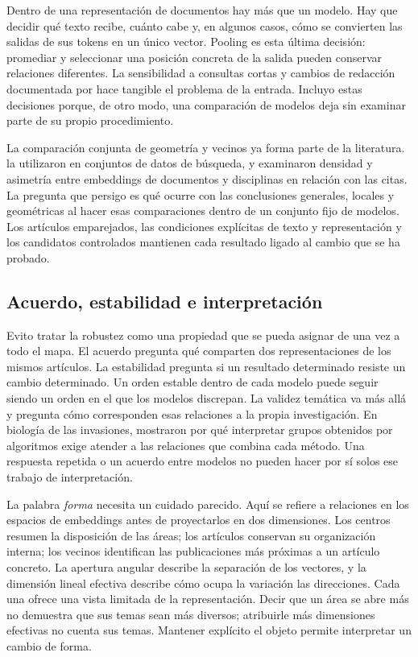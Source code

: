 \documentclass[12pt]{article}
\begin{document}
Dentro de una representación de documentos hay más que un modelo. Hay que decidir qué texto recibe, cuánto cabe y, en algunos casos, cómo se convierten las salidas de sus tokens en un único vector. Pooling es esta última decisión: promediar y seleccionar una posición concreta de la salida pueden conservar relaciones diferentes. La sensibilidad a consultas cortas y cambios de redacción documentada por \citet{singh-singh-2022-inefficiency} hace tangible el problema de la entrada. Incluyo estas decisiones porque, de otro modo, una comparación de modelos deja sin examinar parte de su propio procedimiento.

La comparación conjunta de geometría y vecinos ya forma parte de la literatura. \citet{ref4e1e0d5582} la utilizaron en conjuntos de datos de búsqueda, y \citet{ref6da178065c} examinaron densidad y asimetría entre embeddings de documentos y disciplinas en relación con las citas. La pregunta que persigo es qué ocurre con las conclusiones generales, locales y geométricas al hacer esas comparaciones dentro de un conjunto fijo de modelos. Los artículos emparejados, las condiciones explícitas de texto y representación y los candidatos controlados mantienen cada resultado ligado al cambio que se ha probado.

\subsection{Acuerdo, estabilidad e interpretación}
Evito tratar la robustez como una propiedad que se pueda asignar de una vez a todo el mapa. El acuerdo pregunta qué comparten dos representaciones de los mismos artículos. La estabilidad pregunta si un resultado determinado resiste un cambio determinado. Un orden estable dentro de cada modelo puede seguir siendo un orden en el que los modelos discrepan. La validez temática va más allá y pregunta cómo corresponden esas relaciones a la propia investigación. En biología de las invasiones, \citet{QSSreviewQ17} mostraron por qué interpretar grupos obtenidos por algoritmos exige atender a las relaciones que combina cada método. Una respuesta repetida o un acuerdo entre modelos no pueden hacer por sí solos ese trabajo de interpretación.

La palabra \emph{forma} necesita un cuidado parecido. Aquí se refiere a relaciones en los espacios de embeddings antes de proyectarlos en dos dimensiones. Los centros resumen la disposición de las áreas; los artículos conservan su organización interna; los vecinos identifican las publicaciones más próximas a un artículo concreto. La apertura angular describe la separación de los vectores, y la dimensión lineal efectiva describe cómo ocupa la variación las direcciones. Cada una ofrece una vista limitada de la representación. Decir que un área se abre más no demuestra que sus temas sean más diversos; atribuirle más dimensiones efectivas no cuenta sus temas. Mantener explícito el objeto permite interpretar un cambio de forma.
\end{document}
